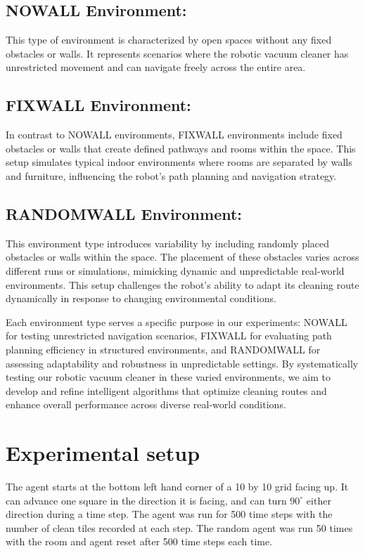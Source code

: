 \documentclass{article}
\begin{document}
\subsection{NOWALL Environment:} This type of environment is characterized by open spaces without any fixed obstacles or walls. It represents scenarios where the robotic vacuum cleaner has unrestricted movement and can navigate freely across the entire area.

\subsection{FIXWALL Environment:} In contrast to NOWALL environments, FIXWALL environments include fixed obstacles or walls that create defined pathways and rooms within the space. This setup simulates typical indoor environments where rooms are separated by walls and furniture, influencing the robot's path planning and navigation strategy.

\subsection{RANDOMWALL Environment:} This environment type introduces variability by including randomly placed obstacles or walls within the space. The placement of these obstacles varies across different runs or simulations, mimicking dynamic and unpredictable real-world environments. This setup challenges the robot's ability to adapt its cleaning route dynamically in response to changing environmental conditions.


Each environment type serves a specific purpose in our experiments: NOWALL for testing unrestricted navigation scenarios, FIXWALL for evaluating path planning efficiency in structured environments, and RANDOMWALL for assessing adaptability and robustness in unpredictable settings. By systematically testing our robotic vacuum cleaner in these varied environments, we aim to develop and refine intelligent algorithms that optimize cleaning routes and enhance overall performance across diverse real-world conditions.


\section{Experimental setup}
The agent starts at the bottom left hand corner of a 10 by 10 grid facing up. It can advance one square in the direction it is facing, and can turn $90^\circ$ either direction during a time step. The agent was run for 500 time steps with the number of clean tiles recorded at each step. The random agent was run 50 times with the room and agent reset after 500 time steps each time.
\end{document}
